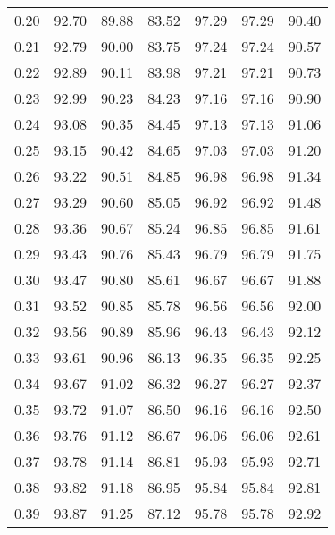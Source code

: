 \begin{tabular}{|c|c|c|c|c|c|c|}
      0.20 &     92.70 &     89.88 &      83.52 &   97.29 &      97.29 &         90.40 \\
      0.21 &     92.79 &     90.00 &      83.75 &   97.24 &      97.24 &         90.57 \\
      0.22 &     92.89 &     90.11 &      83.98 &   97.21 &      97.21 &         90.73 \\
      0.23 &     92.99 &     90.23 &      84.23 &   97.16 &      97.16 &         90.90 \\
      0.24 &     93.08 &     90.35 &      84.45 &   97.13 &      97.13 &         91.06 \\
      0.25 &     93.15 &     90.42 &      84.65 &   97.03 &      97.03 &         91.20 \\
      0.26 &     93.22 &     90.51 &      84.85 &   96.98 &      96.98 &         91.34 \\
      0.27 &     93.29 &     90.60 &      85.05 &   96.92 &      96.92 &         91.48 \\
      0.28 &     93.36 &     90.67 &      85.24 &   96.85 &      96.85 &         91.61 \\
      0.29 &     93.43 &     90.76 &      85.43 &   96.79 &      96.79 &         91.75 \\
      0.30 &     93.47 &     90.80 &      85.61 &   96.67 &      96.67 &         91.88 \\
      0.31 &     93.52 &     90.85 &      85.78 &   96.56 &      96.56 &         92.00 \\
      0.32 &     93.56 &     90.89 &      85.96 &   96.43 &      96.43 &         92.12 \\
      0.33 &     93.61 &     90.96 &      86.13 &   96.35 &      96.35 &         92.25 \\
      0.34 &     93.67 &     91.02 &      86.32 &   96.27 &      96.27 &         92.37 \\
      0.35 &     93.72 &     91.07 &      86.50 &   96.16 &      96.16 &         92.50 \\
      0.36 &     93.76 &     91.12 &      86.67 &   96.06 &      96.06 &         92.61 \\
      0.37 &     93.78 &     91.14 &      86.81 &   95.93 &      95.93 &         92.71 \\
      0.38 &     93.82 &     91.18 &      86.95 &   95.84 &      95.84 &         92.81 \\
      0.39 &     93.87 &     91.25 &      87.12 &   95.78 &      95.78 &         92.92 \\

\end{tabular}
